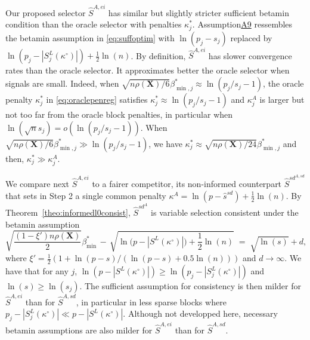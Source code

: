\documentclass[
  12pt]{article}
\newcommand{\bX}{\mathbf{X}}
\begin{document}
Our proposed selector $\hat{S}^{A,ei}$ has similar but slightly stricter sufficient betamin condition than the oracle selector with penalties $\kappa_j^*$. Assumption\hyperlink{lab:A9}{A9} ressembles the betamin assumption in \eqref{eq:suffoptim} with $\ln(p_j-s_j)$ replaced by $\ln(p_j-|S^{L}_j(\kappa^{\circ})|)+\frac12\ln(n)$. By definition, $\hat{S}^{A,ei}$ has slower convergence rates than the oracle selector. It approximates better the oracle selector when signals are small. Indeed, when $\sqrt{n\rho(\bX)/6}\beta_{\min,j}^*\approx \ln(p_j/s_j-1)$, the oracle penalty $\kappa_j^*$ in \eqref{eq:oraclepenreg} satisfies $\kappa_j^*\approx \ln(p_j/s_j-1)$ and $\kappa_j^{A}$ is larger but not too far from the oracle block penalties, in particular when $\ln(\sqrt{n}s_j)=o(\ln(p_j/s_j-1))$. When $\sqrt{n\rho(\bX)/6}\beta_{\min,j}^*\gg \ln(p_j/s_j-1)$, we have $\kappa_j^*\approx \sqrt{n\rho(\bX)/24}\beta_{\min,j}^*$ and then, $\kappa_j^*\gg \kappa_j^{A}$. 

We compare next $\hat{S}^{A,ei}$ to a fairer competitor, its non-informed counterpart $\hat{S}^{sd}^{A,sd}$ that sets in Step 2 a single common penalty $\kappa^{A}=\ln(p-\hat{s}^{sd})+ \tfrac{1}{2}\ln(n)$. By Theorem~\ref{theo:informedl0consist}, $\hat{S}^{sd}^{A}$ is variable selection consistent under the betamin assumption
\begin{equation}\label{eq:betaminEB}
        \sqrt{\frac{ (1-\xi')n\rho(\bX)}{2}}\beta_{\min}^* \,- \,\sqrt{\ln\big(p-|S^{L}(\kappa^{\circ})|\big)+\frac12\ln(n)} \;=\; \sqrt{\ln(s)} +  d,
    \end{equation}
where $\xi'=\tfrac12(1+\ln(p-s)/(\ln(p-s)+0.5\ln(n)))$ and $d\to \infty$. We have that for any $j$, $\ln(p-|S^{L}(\kappa^{\circ})|)\geq \ln(p_j-|S_j^{L}(\kappa^{\circ})|)$ and $\ln(s)\geq \ln(s_j)$. The sufficient assumption for consistency is then milder for $\hat S^{A,ei}$ than for $\hat S^{A,sd}$, in particular in less sparse blocks where $p_j-|S_j^{L}(\kappa^{\circ})|\ll p-|S^{L}(\kappa^{\circ})|$. Although not developped here, necessary betamin assumptions are also milder for $\hat S^{A,ei}$ than for $\hat S^{A,sd}$.
\end{document}

